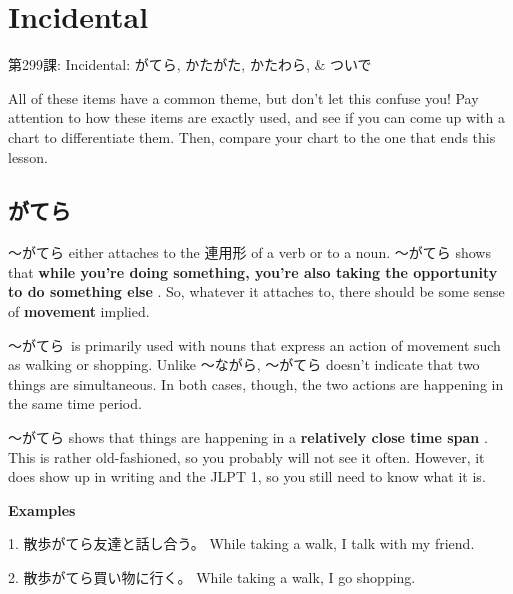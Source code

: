     
\chapter{Incidental}

\begin{center}
\begin{Large}
第299課: Incidental: がてら, かたがた, かたわら, \& ついで 
\end{Large}
\end{center}
 
\par{ All of these items have a common theme, but don't let this confuse you! Pay attention to how these items are exactly used, and see if you can come up with a chart to differentiate them. Then, compare your chart to the one that ends this lesson. }
      
\section{がてら}
 
\par{ ～がてら either attaches to the 連用形 of a verb or to a noun. ～がてら shows that \textbf{while you're doing something, you're also taking the opportunity to do something else }. So, whatever it attaches to, there should be some sense of \textbf{movement }implied. }

\par{ ～がてら is primarily used with nouns that express an action of movement such as walking or shopping. Unlike ～ながら, ～がてら doesn't indicate that two things are simultaneous. In both cases, though, the two actions are happening in the same time period. }

\par{ ～がてら shows that things are happening in a \textbf{relatively close time span }. This is rather old-fashioned, so you probably will not see it often. However, it does show up in writing and the JLPT 1, so you still need to know what it is. }

\begin{center}
 \textbf{Examples }
\end{center}
 
\par{1. 散歩がてら友達と話し合う。 \hfill\break
While taking a walk, I talk with my friend. }
 
\par{2. 散歩がてら買い物に行く。 \hfill\break
While taking a walk, I go shopping. }
 
